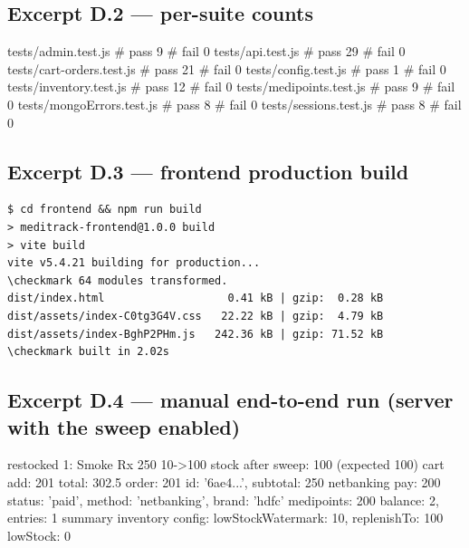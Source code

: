\documentclass[11pt,a4paper]{article}
\begin{document}
\subsection*{Excerpt D.2 --- per-suite counts}
\begin{console}
tests/admin.test.js          # pass 9  # fail 0
tests/api.test.js            # pass 29 # fail 0
tests/cart-orders.test.js    # pass 21 # fail 0
tests/config.test.js         # pass 1  # fail 0
tests/inventory.test.js      # pass 12 # fail 0
tests/medipoints.test.js     # pass 9  # fail 0
tests/mongoErrors.test.js    # pass 8  # fail 0
tests/sessions.test.js       # pass 8  # fail 0
\end{console}

\subsection*{Excerpt D.3 --- frontend production build}
\begin{Verbatim}[fontsize=\scriptsize,frame=single,framerule=0.4pt,
  rulecolor=\color{gray!45},xleftmargin=2pt,framesep=3pt,samepage,commandchars=\\\{\}]
$ cd frontend && npm run build
> meditrack-frontend@1.0.0 build
> vite build
vite v5.4.21 building for production...
\checkmark 64 modules transformed.
dist/index.html                   0.41 kB | gzip:  0.28 kB
dist/assets/index-C0tg3G4V.css   22.22 kB | gzip:  4.79 kB
dist/assets/index-BghP2PHm.js   242.36 kB | gzip: 71.52 kB
\checkmark built in 2.02s
\end{Verbatim}

\subsection*{Excerpt D.4 --- manual end-to-end run (server with the sweep enabled)}
\begin{console}
[inventory] restocked 1: Smoke Rx 250 10->100
stock after sweep: 100 (expected 100)
cart add: 201 { total: 302.5 }
order: 201 { id: '6ae4...', subtotal: 250 }
netbanking pay: 200 { status: 'paid', method: 'netbanking', brand: 'hdfc' }
medipoints: 200 { balance: 2, entries: 1 }
summary inventory config: { lowStockWatermark: 10, replenishTo: 100 } lowStock: 0
\end{console}

\clearpage
{}
\end{document}
